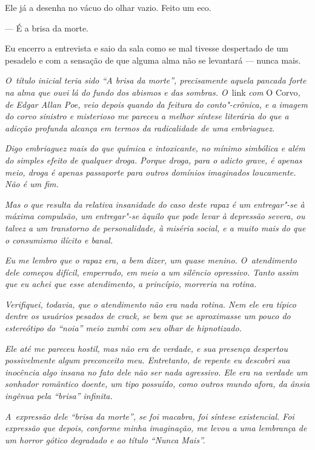 Ele já a desenha no vácuo do olhar vazio. Feito um eco.

— É a brisa da morte.

Eu encerro a entrevista e saio da sala como se mal tivesse despertado de
um pesadelo e com a sensação de que alguma alma não se levantará ---
nunca mais.

\begin{center}\asterisc{}\end{center}

\emph{O~título inicial teria sido ``A brisa da morte'', precisamente aquela
pancada forte na alma que ouvi lá do fundo dos abismos e das sombras. O}~link \emph{com} O Corvo\emph{, de Edgar Allan Poe, veio depois quando da feitura do
conto"-crônica, e a imagem do corvo sinistro e misterioso me pareceu a
melhor síntese literária do que a adicção profunda alcança em termos da
radicalidade de uma embriaguez.}

\emph{Digo embriaguez mais do que química e intoxicante, no mínimo
simbólica e além do simples efeito de qualquer droga. Porque droga, para
o adicto grave, é apenas meio, droga é apenas passaporte para outros
domínios imaginados loucamente. Não é um fim.}

\emph{Mas o que resulta da relativa insanidade do caso deste rapaz é um
entregar"-se à máxima compulsão, um entregar"-se àquilo que pode levar à
depressão severa, ou talvez a um transtorno de personalidade, à miséria
social, e a muito mais do que o consumismo ilícito e banal.}

\emph{Eu me lembro que o rapaz era, a bem dizer, um quase menino. O~atendimento dele começou difícil, emperrado, em meio a um silêncio
opressivo. Tanto assim que eu achei que esse atendimento, a princípio,
morreria na rotina.}

\emph{Verifiquei, todavia, que o atendimento não era nada rotina. Nem
ele era típico dentre os usuários pesados de crack, se bem que se
aproximasse um pouco do estereótipo do ``noia'' meio zumbi com seu olhar
de hipnotizado.}

\emph{Ele até me pareceu hostil, mas não era de verdade, e sua presença
despertou possivelmente algum preconceito meu. Entretanto, de repente eu
descobri sua inocência algo insana no fato dele não ser nada agressivo.
Ele era na verdade um sonhador romântico doente, um tipo possuído, como
outros mundo afora, da ânsia ingênua pela ``brisa'' infinita.}

\emph{A~expressão dele ``brisa da morte'', se foi macabra, foi síntese
existencial. Foi expressão que depois, conforme minha imaginação, me
levou a uma lembrança de um horror gótico degradado e ao título ``Nunca
Mais''.}

